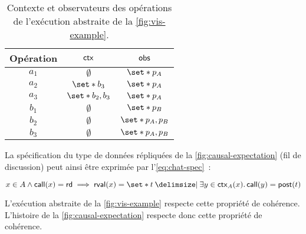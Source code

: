 \begin{table}[htb]
    \centering
    \begin{tabular}{ccc}
        Opération & $\operatorname{\mathsf{ctx}}$ & $\operatorname{\mathsf{obs}}$ \\
        \toprule
        $a_1$ & $\emptyset$ & $\set*{p_A}$ \\
        $a_2$ & $\set*{b_3}$ & $\set*{p_A}$ \\
        $a_3$ & $\set*{b_2, b_3}$ & $\set*{p_A}$ \\
        $b_1$ & $\emptyset$ & $\set*{p_B}$ \\
        $b_2$ & $\emptyset$ & $\set*{p_A, p_B}$ \\
        $b_3$ & $\emptyset$ & $\set*{p_A, p_B}$ \\
    \end{tabular}
    \caption{Contexte et observateurs des opérations de l'exécution abstraite de la \autoref{fig:vis-example}.}\label{tab:op-ctx-obs}
\end{table}

La spécification du type de données répliquées de la \autoref{fig:causal-expectation} (fil de discussion) peut ainsi être exprimée par l'\autoref{eq:chat-spec}~:

\begin{equation}\label{eq:chat-spec}
    x \in A \land \trm{call}(x) = \trm{rd} \implies \trm{rval}(x) = \set*{t \given \exists y \in \trm{ctx}_A(x) \qsep \trm{call}(y) = \trm{post}(t)}
\end{equation}

L'exécution abstraite de la \autoref{fig:vis-example} respecte cette propriété de cohérence.
L'histoire de la \autoref{fig:causal-expectation} respecte donc cette propriété de cohérence.



